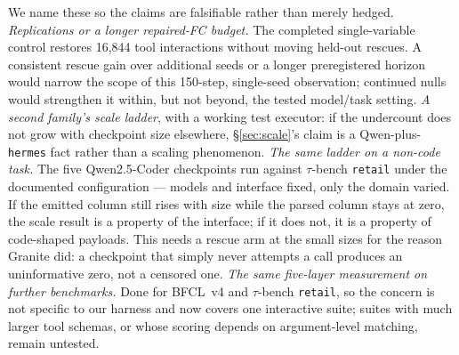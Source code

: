 We name these so the claims are falsifiable rather than merely hedged.
\emph{Replications or a longer repaired-FC budget.} The completed single-variable control restores
16{,}844 tool interactions without moving held-out rescues. A consistent rescue gain over
additional seeds or a longer preregistered horizon would narrow the scope of this 150-step,
single-seed observation; continued nulls would strengthen it within, but not beyond, the tested
model/task setting.
\emph{A second family's scale ladder}, with a working test executor: if the undercount does not
grow with checkpoint size elsewhere, \S\ref{sec:scale}'s claim is a Qwen-plus-\texttt{hermes} fact
rather than a scaling phenomenon.
\emph{The same ladder on a non-code task.} The five Qwen2.5-Coder checkpoints run against
$\tau$-bench \texttt{retail} under the documented configuration --- models and interface fixed,
only the domain varied. If the emitted column still rises with size while the parsed column stays
at zero, the scale result is a property of the interface; if it does not, it is a property of
code-shaped payloads. This needs a rescue arm at the small sizes for the reason Granite did: a
checkpoint that simply never attempts a call produces an uninformative zero, not a censored one.
\emph{The same five-layer measurement on further benchmarks.} Done for BFCL~v4 and $\tau$-bench
\texttt{retail}, so the concern is not specific to our harness and now covers one interactive
suite; suites with much larger tool schemas, or whose scoring depends on argument-level matching,
remain untested.
